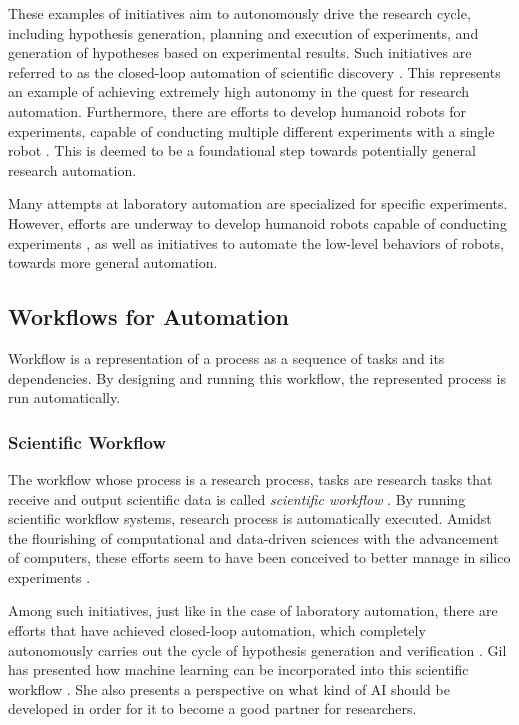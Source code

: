 \documentclass{article}
\begin{document}
These examples of initiatives aim to autonomously drive the research cycle, including hypothesis generation, planning and execution of experiments, and generation of hypotheses based on experimental results. Such initiatives are referred to as the closed-loop automation of scientific discovery     \cite{burger2020mobile,king2004functional}. This represents an example of achieving extremely high autonomy in the quest for research automation. Furthermore, there are efforts to develop humanoid robots for experiments, capable of conducting multiple different experiments with a single robot \cite{yachie2017robotic}. This is deemed to be a foundational step towards potentially general research automation.

Many attempts at laboratory automation are specialized for specific experiments. However, efforts are underway to develop humanoid robots capable of conducting experiments \cite{yachie2017robotic}, as well as initiatives to automate the low-level behaviors of robots, towards more general automation.


\subsection{Workflows for Automation}
Workflow is a representation of a process as a sequence of tasks and its dependencies. By designing and running this workflow, the represented process is run automatically.

\subsubsection{Scientific Workflow}
The workflow whose process is a research process, tasks are research tasks that receive and output scientific data is called \textit{scientific workflow} \cite{ludascher2009scientific}. By running scientific workflow systems, research process is automatically executed.  Amidst the flourishing of computational and data-driven sciences with the advancement of computers, these efforts seem to have been conceived to better manage in silico experiments \cite{liew2016scientific}. 

Among such initiatives, just like in the case of laboratory automation, there are efforts that have achieved closed-loop automation, which completely autonomously carries out the cycle of hypothesis generation and verification \cite{gil2017towards}. Gil has presented how machine learning can be incorporated into this scientific workflow \cite{gil2022will}. She also presents a perspective on what kind of AI should be developed in order for it to become a good partner for researchers.
\end{document}
